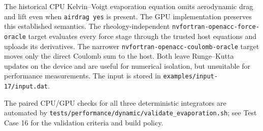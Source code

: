 The historical CPU Kelvin--Voigt evaporation equation omits aerodynamic drag
and lift even when \texttt{airdrag yes} is present.  The GPU implementation
preserves this established semantics. The rheology-independent
\texttt{nvfortran-openacc-force-oracle} target evaluates every force stage
through the trusted host equations and uploads its derivatives. The narrower
\texttt{nvfortran-openacc-coulomb-oracle} target moves only the direct
Coulomb sum to the host. Both leave Runge--Kutta updates on the device and are
useful for numerical isolation, but unsuitable for performance measurements.
The input is stored in \texttt{examples/input-17/input.dat}.

The paired CPU/GPU checks for all three deterministic integrators are
automated by
\texttt{tests/performance/dynamic/validate\_evaporation.sh}; see Test Case 16
for the validation criteria and build policy.
